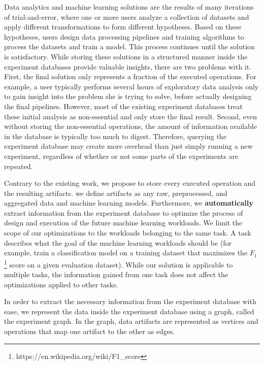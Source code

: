 Data analytics and machine learning solutions are the results of many iterations of trial-and-error, where one or more users analyze a collection of datasets and apply different transformations to form different hypotheses.
Based on these hypotheses, users design data processing pipelines and training algorithms to process the datasets and train a model.
This process continues until the solution is satisfactory. 
While storing these solutions in a structured manner inside the experiment databases provide valuable insights, there are two problems with it.
First, the final solution only represents a fraction of the executed operations.
For example, a user typically performs several hours of exploratory data analysis only to gain insight into the problem she is trying to solve, before actually designing the final pipelines.
However, most of the existing experiment databases treat these initial analysis as non-essential and only store the final result.
Second, even without storing the non-essential operations, the amount of information available in the database is typically too much to digest.
Therefore, querying the experiment database may create more overhead than just simply running a new experiment, regardless of whether or not some parts of the experiments are repeated.

Contrary to the existing work, we propose to store every executed operation and the resulting artifacts.
we define artifacts as any raw, preprocessed, and aggregated data and machine learning models.
Furthermore, we \textbf{automatically} extract information from the experiment database to optimize the process of design and execution of the future machine learning workloads.
We limit the scope of our optimizations to the workloads belonging to the same task.
A task describes what the goal of the machine learning workloads should be (for example, train a classification model on a training dataset that maximizes the $F_1$\footnote{https://en.wikipedia.org/wiki/F1\_score} score on a given evaluation dataset).
While our solution is applicable to multiple tasks, the information gained from one task does not affect the optimizations applied to other tasks.

In order to extract the necessary information from the experiment database with ease, we represent the data inside the experiment database using a graph, called the experiment graph.
In the graph, data artifacts are represented as vertices and operations that map one artifact to the other as edges.

